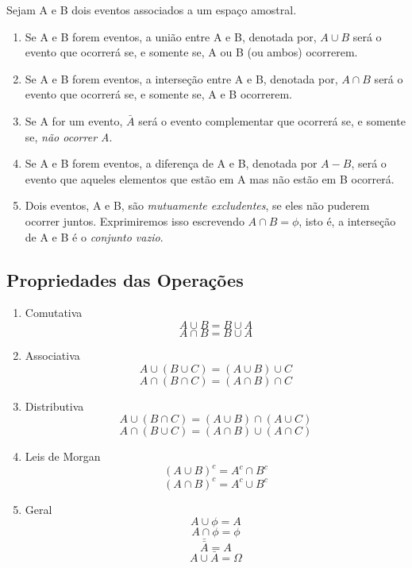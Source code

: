 Sejam A e B dois eventos associados a um espaço amostral.

\begin{enumerate}
    \item Se A e B forem eventos, a união entre A e B, denotada por, $A \cup B$ será o evento que
    ocorrerá se, e somente se, A ou B (ou ambos) ocorrerem.
    \item Se A e B forem eventos, a interseção entre A e B, denotada por, $A \cap B$ será o evento que
    ocorrerá se, e somente se, A e B ocorrerem.
    \item Se A for um evento, $\bar{A}$ será o evento complementar que ocorrerá
    se, e somente se, \emph{não ocorrer A}.
    \item Se A e B forem eventos, a diferença de A e B, denotada
    por $A-B$, será o evento que aqueles elementos que estão em A mas
    não estão em B ocorrerá.
    \item Dois eventos, A e B, são \emph{mutuamente excludentes}, se eles
    não puderem ocorrer juntos. Exprimiremos isso escrevendo $A \cap B =
    \phi$, isto é, a interseção de A e B é o \emph{conjunto vazio}.
\end{enumerate}


\newpage
\subsection{Propriedades das Operações}

\begin{enumerate}
    \item Comutativa
$$A \cup B = B \cup A$$
$$A \cap B = B \cup A$$
    \item Associativa
$$A \cup (B \cup C) = (A \cup B)\cup C$$
$$A \cap (B \cap C) = (A \cap B)\cap C$$
    \item Distributiva
$$A \cup (B \cap C) = (A \cup B)\cap (A \cup C)$$
$$A \cap (B \cup C) = (A \cap B)\cup (A \cap C)$$
    \item Leis de Morgan
$$ (A \cup B)^{c}= A^{c} \cap B^{c}$$
$$ (A \cap B)^{c}= A^{c} \cup B^{c}$$
\item Geral
$$ A \cup \phi = A$$
$$ A \cap \phi = \phi$$
$$ \bar{\bar{A}}=A $$
$$ A \cup \bar{A}= \Omega $$
\end{enumerate}















